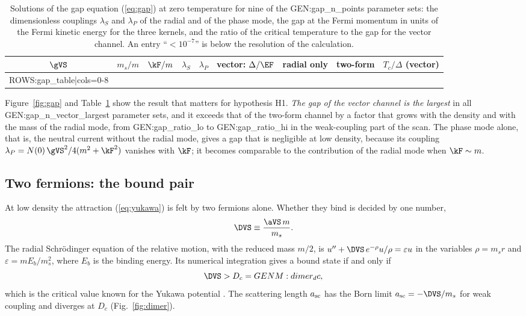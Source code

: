 \begin{table}
\caption{\label{tab:gap}Solutions of the gap equation (\ref{eq:gap}) at zero temperature for nine of
the {{GEN:gap_n_points}} parameter sets: the dimensionless couplings $\lambda_S$ and $\lambda_P$ of
the radial and of the phase mode, the gap at the Fermi momentum in units of the Fermi kinetic energy
for the three kernels, and the ratio of the critical temperature to the gap for the vector channel.
An entry ``$<10^{-7}$'' is below the resolution of the calculation.}
\begin{ruledtabular}
\begin{tabular}{ccccccccc}
$\gVS$ & $m_s/m$ & $\kF/m$ & $\lambda_S$ & $\lambda_P$ & vector: $\Delta/\EF$ & radial only & two-form & $T_c/\Delta$ (vector) \\
\hline
{{ROWS:gap_table|cols=0-8}}
\end{tabular}
\end{ruledtabular}
\end{table}

Figure~\ref{fig:gap} and Table~\ref{tab:gap} show the result that matters for hypothesis H1. \emph{The
gap of the vector channel is the largest} in all {{GEN:gap_n_vector_largest}} parameter sets, and it
exceeds that of the two-form channel by a factor that grows with the density and with the mass of the
radial mode, from {{GEN:gap_ratio_lo}} to {{GEN:gap_ratio_hi}} in the weak-coupling part of the scan.
The phase mode alone, that is, the neutral current without the radial mode, gives a gap that is
negligible at low density, because its coupling $\lambda_P=N(0)\,\gVS^2/4(m^2+\kF^2)$ vanishes with
$\kF$; it becomes comparable to the contribution of the radial mode when $\kF\sim m$.

\subsection{Two fermions: the bound pair}
\label{sec:dimer}

At low density the attraction (\ref{eq:yukawa}) is felt by two fermions alone. Whether they bind is
decided by one number,
\begin{equation}
\DVS\equiv\frac{\aVS\,m}{m_s}.
\label{eq:DVS}
\end{equation}
The radial Schr\"odinger equation of the relative motion, with the reduced mass $m/2$, is
$u''+\DVS\,e^{-\rho}u/\rho=\varepsilon u$ in the variables $\rho=m_sr$ and $\varepsilon=mE_b/m_s^2$,
where $E_b$ is the binding energy. Its numerical integration gives a bound state if and only if
\begin{equation}
\DVS>D_c={{GENM:dimer_dc}},
\label{eq:Dc}
\end{equation}
which is the critical value known for the Yukawa potential \cite{RogersGraboskeHarwood1970}. The
scattering length $a_{\rm sc}$ has the Born limit $a_{\rm sc}=-\DVS/m_s$ for weak coupling and diverges at $D_c$
(Fig.~\ref{fig:dimer}).

